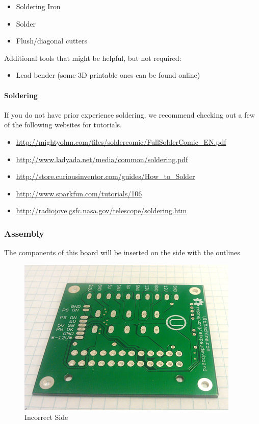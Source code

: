 \begin{itemize}
\itemsep1pt\parskip0pt
\item
  Soldering Iron
\item
  Solder
\item
  Flush/diagonal cutters
\end{itemize}

Additional tools that might be helpful, but not required:

\begin{itemize}
\itemsep1pt\parskip0pt
\item
  Lead bender (some 3D printable ones can be found online)
\end{itemize}

\paragraph{Soldering}

If you do not have prior experience soldering, we recommend checking out
a few of the following websites for tutorials.

\begin{itemize}
\itemsep1pt\parskip0pt
\item
  \url{http://mightyohm.com/files/soldercomic/FullSolderComic_EN.pdf}
\item
  \url{http://www.ladyada.net/media/common/soldering.pdf}
\item
  \url{http://store.curiousinventor.com/guides/How_to_Solder}
\item
  \url{http://www.sparkfun.com/tutorials/106}
\item
  \url{http://radiojove.gsfc.nasa.gov/telescope/soldering.htm}
\end{itemize}

\subsubsection{Assembly}

The components of this board will be inserted on the side with the
outlines

\begin{figure}[htbp]
\centering
\includegraphics{./png/incorrect-side.png}
\caption{Incorrect Side}
\end{figure}

